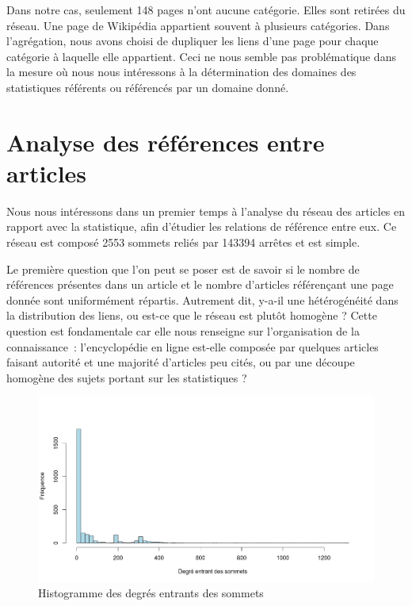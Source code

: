 \documentclass[a4paper]{article}
\begin{document}
Dans notre cas, seulement 148 pages n'ont aucune catégorie. Elles sont retirées du réseau. Une page de Wikipédia appartient souvent à plusieurs catégories. Dans l'agrégation, nous avons choisi de dupliquer les liens d'une page pour chaque catégorie à laquelle elle appartient. Ceci ne nous semble pas problématique dans la mesure où nous nous intéressons à la détermination des domaines des statistiques référents ou référencés par un domaine donné.


\section{Analyse des références entre articles} 

Nous nous intéressons dans un premier temps à l'analyse du réseau des articles en rapport avec la statistique, afin d'étudier les relations de référence entre eux. Ce réseau est composé 2553 sommets reliés par 143394 arrêtes et est simple.

Le première question que l'on peut se poser est de savoir si le nombre de références présentes dans un article et le nombre d'articles référençant une page donnée sont uniformément répartis. Autrement dit, y-a-il une hétérogénéité dans la distribution des liens, ou est-ce que le réseau est plutôt homogène ? Cette question est fondamentale car elle nous renseigne sur l'organisation de la connaissance~: l'encyclopédie en ligne est-elle composée par quelques articles faisant autorité et une majorité d'articles peu cités, ou par une découpe homogène des sujets portant sur les statistiques ?

\begin{figure}[h!]
   \centering
   \caption{\label{hist-in-deg} Histogramme des degrés entrants des sommets}
   \includegraphics[scale=0.40]{../images/vertex_in_dist}
\end{figure}
\end{document}
